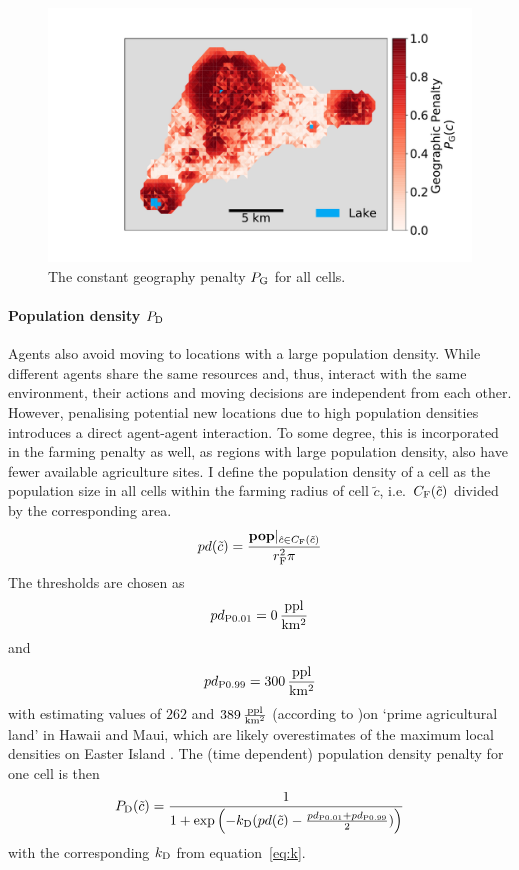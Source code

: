 \begin{figure}
	\centering
	\includegraphics[width=1\linewidth]{images/Plot_PG}
	\caption{The constant geography penalty $P_{\rm G}$ for all cells.}
	\label{fig:P_G}
\end{figure}

\paragraph{Population density $P_{\rm D}$}
Agents also avoid moving to locations with a large population density.
While different agents share the same resources and, thus, interact with the same environment, their actions and moving decisions are independent from each other. 
However, penalising potential new locations due to high population densities introduces a direct agent-agent interaction. 
To some degree, this is incorporated in the farming penalty as well, as regions with large population density, also have fewer available agriculture sites.
I define the population density of a cell as the population size in all cells within the farming radius of cell $\tilde{c}$, i.e.\ $C_{\rm F}(\tilde{c})$ divided by the corresponding area.
\begin{equation}
pd (\tilde{c}) = \frac{\mathbf{pop}|_{\hat{c} \in C_{\rm F}(\tilde{c}) }}{r_{\rm F}^2 \pi}
\end{equation}
The thresholds are chosen as
\begin{equation}
pd_{\rm P0.01} = 0 \, {\rm \frac{ppl}{km^2}}
\end{equation}
and 
\begin{equation}
pd_{\rm P0.99} = 300 \, {\rm \frac{ppl}{km^2}}
\end{equation}
with \citet{Kirch2010} estimating values of $262$ and $389\, {\rm \frac{ppl}{km^2}}$ (according to \citet{Puleston2017})on `prime agricultural land' in Hawaii and Maui, which are likely overestimates of the maximum local densities on Easter Island \citep{Puleston2017}. %
The (time dependent) population density penalty for one cell is then
\begin{equation}
P_{\rm D}(\tilde{c}) = \frac{1}{1+\exp\left( - k_{\rm D} (pd(\tilde{c})-\frac{pd_{\rm P0.01} + pd_{\rm P0.99}}{2}) \right)}
\end{equation}
with the corresponding $k_{\rm D}$ from equation~\ref{eq:k}.
		
